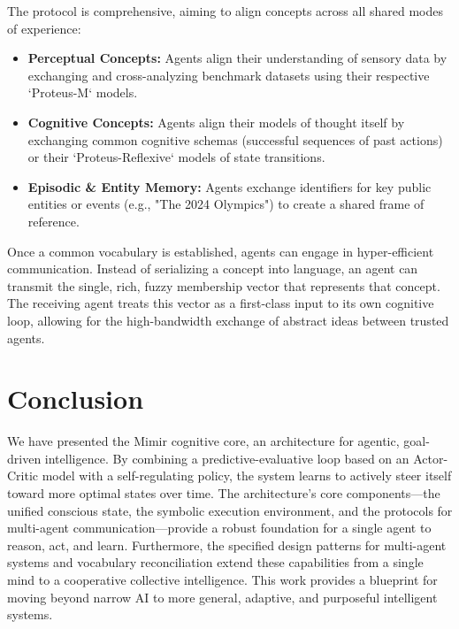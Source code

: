\documentclass{article}
\begin{document}
The protocol is comprehensive, aiming to align concepts across all shared modes of experience:
\begin{itemize}
    \item \textbf{Perceptual Concepts:} Agents align their understanding of sensory data by exchanging and cross-analyzing benchmark datasets using their respective `Proteus-M` models.
    \item \textbf{Cognitive Concepts:} Agents align their models of thought itself by exchanging common cognitive schemas (successful sequences of past actions) or their `Proteus-Reflexive` models of state transitions.
    \item \textbf{Episodic \& Entity Memory:} Agents exchange identifiers for key public entities or events (e.g., "The 2024 Olympics") to create a shared frame of reference.
\end{itemize}

Once a common vocabulary is established, agents can engage in hyper-efficient communication. Instead of serializing a concept into language, an agent can transmit the single, rich, fuzzy membership vector that represents that concept. The receiving agent treats this vector as a first-class input to its own cognitive loop, allowing for the high-bandwidth exchange of abstract ideas between trusted agents.

\section{Conclusion}

We have presented the Mimir cognitive core, an architecture for agentic, goal-driven intelligence. By combining a predictive-evaluative loop based on an Actor-Critic model with a self-regulating policy, the system learns to actively steer itself toward more optimal states over time. The architecture's core components---the unified conscious state, the symbolic execution environment, and the protocols for multi-agent communication---provide a robust foundation for a single agent to reason, act, and learn. Furthermore, the specified design patterns for multi-agent systems and vocabulary reconciliation extend these capabilities from a single mind to a cooperative collective intelligence. This work provides a blueprint for moving beyond narrow AI to more general, adaptive, and purposeful intelligent systems.



\end{document}
